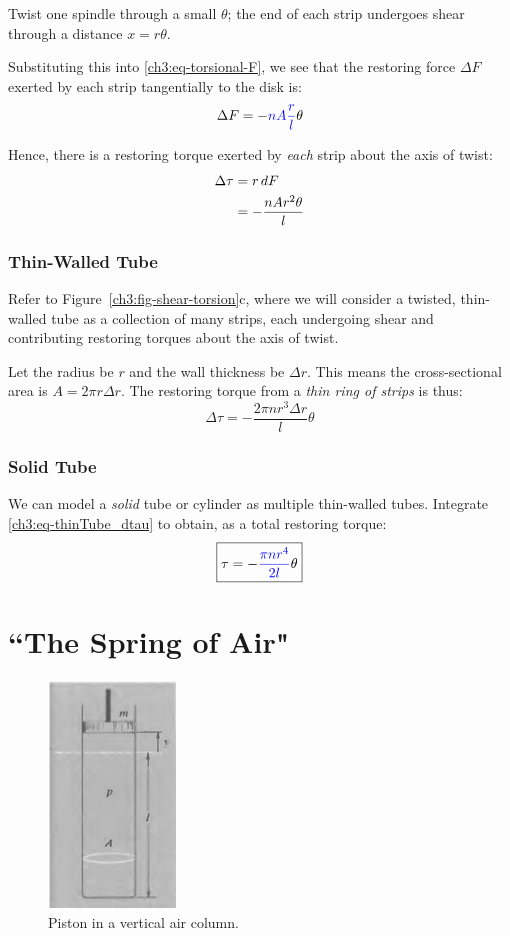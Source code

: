Twist one spindle through a small $\theta$; the end of each strip undergoes shear through a distance $x=r\theta$. 

Substituting this into \eqref{ch3:eq-torsional-F}, we see that the restoring force $\Delta F$ exerted by each strip tangentially to the disk is:
\[ \Delta F = -\textcolor{blue}{nA\frac{r}{l}} \theta \]

Hence, there is a restoring torque exerted by \emph{each} strip about the axis of twist:
\begin{align*}
	\Delta\tau &= r\,dF  \notag \\
	&= -\frac{nAr^2\theta}{l} 
\end{align*}

\subsubsection{Thin-Walled Tube}
Refer to Figure~\ref{ch3:fig-shear-torsion}c, where we will consider a twisted, thin-walled tube as a collection of many strips, each undergoing shear and contributing restoring torques about the axis of twist.

Let the radius be $r$ and the wall thickness be $\Delta r$. This means the cross-sectional area is $A=2\pi r \Delta r$. The restoring torque from a \emph{thin ring of strips} is thus:
\begin{equation}
\Delta \tau = -\frac{2\pi nr^3\Delta r}{l} \theta  \label{ch3:eq-thinTube_dtau}
\end{equation}

\subsubsection{Solid Tube}
We can model a \textit{solid} tube or cylinder as multiple thin-walled tubes. Integrate \eqref{ch3:eq-thinTube_dtau} to obtain, as a total restoring torque:
\begin{equation*}
	\boxed{\tau = -\textcolor{blue}{\frac{\pi nr^4}{2l}} \theta}
\end{equation*}

\section{``The Spring of Air"} \label{ch3:sec-air}

\begin{figure}
	\centering
	\includegraphics[scale=0.7]{phys232/Ch3-air.png} \caption{Piston in a vertical air column.}\label{ch3:fig-air}
\end{figure}

